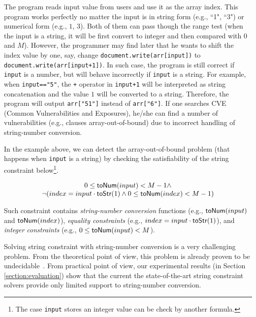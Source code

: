 \documentclass[sigplan,review,anonymous]{acmart}\settopmatter{printfolios=true,printccs=false,printacmref=false}
\begin{document}
{The program reads input value from users and use it as the array index. This program works perfectly no matter the input is in string form (e.g., ``1", ``3") or numerical form (e.g., $1$, $3$). Both of them can pass though the range test (when the input is a string, it will be first convert to integer and then compared with $0$ and $M$). However, the programmer may find later that he wants to shift the index value by one, say, change \texttt{document.write(arr[input])} to \texttt{document.write(arr[input+1])}. In such case, the program is still correct if \texttt{input} is a number, but will behave incorrectly if \texttt{input} is a string. For example, when \texttt{input=="5"}, the \texttt{+} operator in \texttt{input+1} will be interpreted as string concatenation and the value $1$ will be converted to a string. Therefore, the program will output \texttt{arr["51"]} instead of \texttt{arr["6"]}. If one searches CVE (Common Vulnerabilities and Exposures), he/she can find a number of vulnerabilities (e.g., clauses array-out-of-bound) due to incorrect handling of string-number conversion.

In the example above, we can detect the array-out-of-bound problem (that happens when \texttt{input} is a string) by checking the satisfiability of the string constraint below\footnote{The case \texttt{input} stores an integer value can be check by another formula.}. 

$$
\begin{array}{c}
0 \leq \mbox{\textsf{toNum}($input$)}<M-1 \wedge \\
\neg(index = input\cdot \mbox{\textsf{toStr}($1$)} \wedge 0 \leq \mbox{\textsf{toNum}($index$)} <M-1)
\end{array}
$$


Such constraint contains \textit{string-number conversion} functions (e.g., $\mbox{\textsf{toNum}($input$)}$ and $\mbox{\textsf{toNum}($index$)}$), \textit{equality constraints} (e.g., $index = input\cdot \mbox{\textsf{toStr}($1$)}$), and \textit{integer constraints} (e.g., $0 \leq \mbox{\textsf{toNum}($input$)}<M$). }



Solving string constraint with string-number conversion is a very challenging problem. From the theoretical point of view, this problem is already proven to be undecidable~\cite{day2018satisfiability}. From practical point of view, 
 our experimental results  (in Section \ref{section:evaluation}) show that the current  the state-of-the-art string constraint solvers provide only limited support to string-number conversion. 
\end{document}
